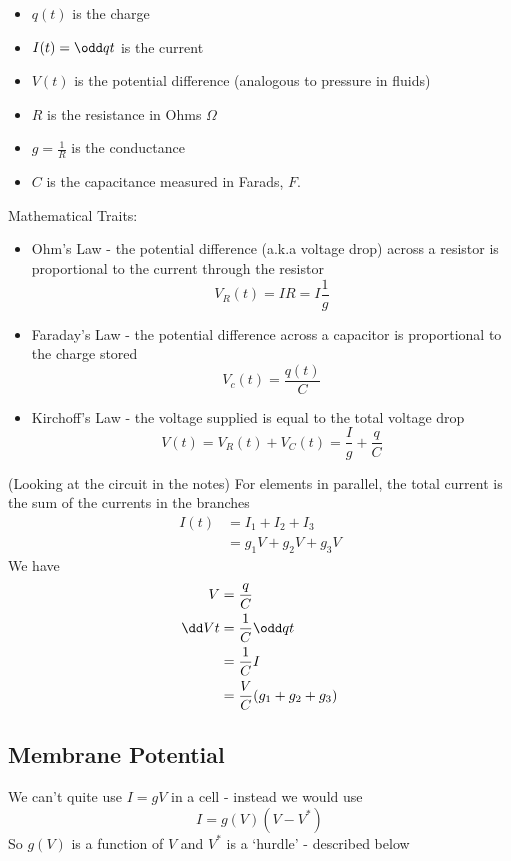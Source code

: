 \documentclass{X:/Documents/Coding/Latex/myassignment}
\begin{document}
\begin{itemize}
	\item $q(t)$ is the charge 
	\item $I(t) = \odd qt$ is the current
	\item $V(t)$ is the potential difference (analogous to pressure in fluids)
	\item $R$ is the resistance in Ohms $\Omega$
	\item $g = \frac1R$ is the conductance
	\item $C$ is the capacitance measured in Farads, $F.$
\end{itemize}
Mathematical Traits:
\begin{itemize}
	\item Ohm's Law - the potential difference (a.k.a voltage drop) across a resistor is proportional to the current through the resistor
	\[V_R(t) = IR = I\frac{1}{g}\]
	\item Faraday's Law - the potential difference across a capacitor is proportional to the charge stored
	\[V_c(t) = \frac{q(t)}{C}\]
	\item Kirchoff's Law - the voltage supplied is equal to the total voltage drop
	\[V(t) = V_R(t) + V_C(t) = \frac{I}{g} + \frac{q}{C}\]
\end{itemize}

(Looking at the circuit in the notes)
For elements in parallel, the total current is the sum of the currents in the branches
\begin{align*}
	I(t) &= I_1 + I_2 + I_3 \\
	&=g_1V + g_2 V + g_3 V
\end{align*}
We have
\begin{align*}
	V &= \frac{q}{C}\\
	\dd Vt &= \frac1C \odd qt \\
	&= \frac1C I\\
	&= \frac{V}{C} (g_1+g_2+g_3)
\end{align*}


\subsection{Membrane Potential}
We can't quite use $I = gV$ in a cell - instead we would use
\[I = g(V) \left(V - V^*\right)\]
So $g(V)$ is a function of $V$ and $V^*$ is a `hurdle' - described below
\end{document}
